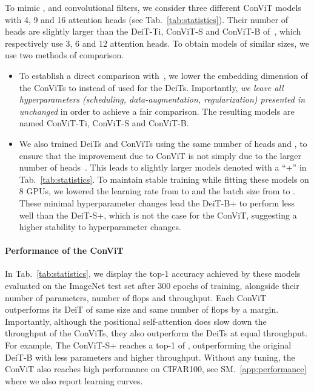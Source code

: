 To mimic ,  and  convolutional filters, we consider three different ConViT models with 4, 9 and 16 attention heads (see Tab.~\ref{tab:statistics}). Their number of heads are slightly larger than the DeiT-Ti, ConViT-S and ConViT-B of~\citet{touvron2020training}, which respectively use 3, 6 and 12 attention heads. To obtain models of similar sizes, we use two methods of comparison.
\begin{itemize}
    \item To establish a direct comparison with~\citet{touvron2020training}, we lower the embedding dimension of the ConViTs to  instead of  used for the DeiTs. Importantly, \textit{we leave all hyperparameters (scheduling, data-augmentation, regularization) presented in~\cite{touvron2020training} unchanged} in order to achieve a fair comparison. The resulting models are named ConViT-Ti, ConViT-S and ConViT-B.
    \item We also trained DeiTs and ConViTs using the same number of heads and , to ensure that the improvement due to ConViT is not simply due to the larger number of heads~\cite{touvron2021going}. This leads to slightly larger models denoted with a ``+'' in Tab.~\ref{tab:statistics}. To maintain stable training while fitting these models on 8 GPUs, we lowered the learning rate from  to  and the batch size from  to . These minimal hyperparameter changes lead the DeiT-B+ to perform less well than the DeiT-S+, which is not the case for the ConViT, suggesting a higher stability to hyperparameter changes.
\end{itemize}

\paragraph{Performance of the ConViT}

In Tab.~\ref{tab:statistics}, we display the top-1 accuracy achieved by these models evaluated on the ImageNet test set after 300 epochs of training, alongside their number of parameters, number of flops and throughput. Each ConViT outperforms its DeiT of same size and same number of flops by a margin. Importantly, although the positional self-attention does slow down the throughput of the ConViTs, they also outperform the DeiTs at equal throughput. For example, The ConViT-S+ reaches a top-1 of , outperforming the original DeiT-B with less parameters and higher throughput. Without any tuning, the ConViT also reaches high performance on CIFAR100, see SM.~\ref{app:performance} where we also report learning curves.

